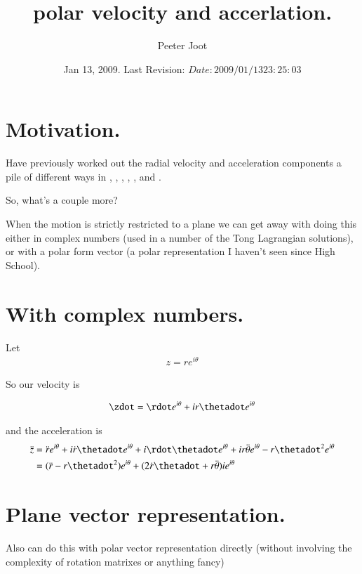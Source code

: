 \documentclass{article}
\title{ polar velocity and accerlation. }
\author{Peeter Joot}
\date{ Jan 13, 2009.  Last Revision: $Date: 2009/01/13 23:25:03 $ }
\begin{document}
\maketitle{}

\section{ Motivation. }

Have previously worked out the radial velocity and acceleration components a pile of different ways in
\cite{PJAngAcc}, 
\cite{PJAngAccCross}, 
\cite{PJAngVel}, 
\cite{PJKeRot}, 
\cite{PJRadialDer}, and
\cite{PJUnitDer}.

So, what's a couple more?

When the motion is strictly restricted to a plane we can get away with doing this either in complex numbers
(used in a number of the Tong Lagrangian solutions), or with a polar form  vector (a polar representation
I haven't seen since High School).

\section{ With complex numbers. }

Let
\begin{align*}
z = r e^{i\theta}
\end{align*}

So our velocity is

\begin{align*}
\zdot = \rdot e^{i\theta} + i r \thetadot e^{i\theta}
\end{align*}

and the acceleration is
\begin{align*}
\ddot{z}
&= \ddot{r} e^{i\theta} + i \dot{r} \thetadot e^{i\theta}
 + i \rdot \thetadot e^{i\theta}
 + i r \ddot{\theta} e^{i\theta}
 - r \thetadot^2 e^{i\theta} \\
&= (\ddot{r} - r \thetadot^2 ) e^{i\theta} + (2 \dot{r} \thetadot + r \ddot{\theta} ) i e^{i\theta}
\end{align*}

\section{ Plane vector representation. }

Also can do this with polar vector representation directly (without involving the complexity of rotation matrixes or anything fancy)
\end{document}

